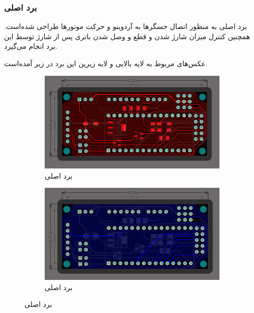 \documentclass[a4paper,12pt]{report}
\begin{document}
	\subsubsection{
	برد اصلی
	}\label{subsubsec1:subsec2:sec3:chap2}
		برد اصلی به منظور اتصال حسگر‌ها به آردوینو و حرکت موتور‌ها طراحی شده‌است.
		همچنین کنترل میزان شارژ شدن و قطع و وصل شدن باتری پس از شارژ توسط این برد انجام می‌گیرد.

		عکس‌های مربوط به لایه بالایی و لایه زیرین این برد در زیر آمده‌است.

		\begin{figure}[!h]
			\centering
			\begin{subfigure}{0.6\linewidth}
				\includegraphics[width=0.9\linewidth]{resources/altium-main-board-top-layer.jpg}
				\caption{
				برد اصلی
				}
				\label{subfig1:fig1:subsubsec2:subsec2:sec3:chap2}
			\end{subfigure}\vspace*{5mm}
			\begin{subfigure}{0.6\linewidth}
				\includegraphics[width=0.9\linewidth]{resources/altium-main-board-bottom-layer.jpg}
				\caption{
				برد اصلی
				}
				\label{subfig2:fig1:subsubsec2:subsec2:sec3:chap2}
			\end{subfigure}
			\caption{
			برد اصلی}
			\label{fig1:subsubsec2:subsec2:sec3:chap2}
		\end{figure}
\end{document}
